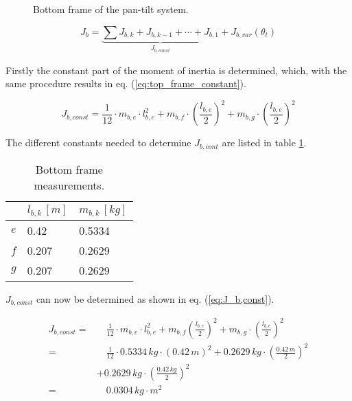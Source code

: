 \documentclass[../../main]{subfiles}
\begin{document}
\begin{figure}[h]
  \centering
  
  \caption{Bottom frame of the pan-tilt system.}
  \label{fig:BottomFrame}
\end{figure}

\begin{equation}
  \label{eq:Base_frame_eq}
  J_b =
  \underbrace{
  \sum J_{b,k} + J_{b,k-1} + \dotsb + J_{b,1}}_\text{$J_{b,const}$} + J_{b,var}(\theta_t)
\end{equation}

Firstly the constant part of the moment of inertia is determined, which, with the same procedure results in eq. (\ref{eq:top_frame_constant}).

\begin{equation}
  \label{eq:top_frame_constant}
  J_{b,const} = \frac{1}{12}\cdot m_{b,e}\cdot l_{b,e}^2 + m_{b,f} \cdot \left( \frac{l_{b,e}}{2} \right)^2 + m_{b,g} \cdot \left(\frac{l_{b,e}}{2}\right)^2
\end{equation}

The different constants needed to determine $J_{b,cont}$ are listed in table \ref{tab:Base_frame_table}.

\begin{table}[H]
\centering
\begin{tabular}{|l|l|l|}
\hline
  & $l_{b,k} \, \si{[m]}$ & $m_{b,k} \, \si{[kg]}$ \\
\hline
$e$ & 0.42  & 0.5334  \\
\hline
$f$ & 0.207  & 0.2629  \\
\hline
$g$ & 0.207 & 0.2629  \\
\hline
\end{tabular}
\caption{Bottom frame measurements.}
    \label{tab:Base_frame_table}
\end{table}

$J_{b,const}$ can now be determined as shown in eq. (\ref{eq:J_b,const}).

\begin{equation}
  \label{eq:J_b,const}
  \begin{split}
      J_{b,const} =& \quad \frac{1}{12} \cdot m_{b,e} \cdot l_{b,e}^2 + m_{b,f} \left( \frac{l_{b,e}}{2} \right)^2 + m_{b,g} \cdot \left(\frac{l_{b,e}}{2}\right)^2\\
      =& \quad \frac{1}{12} \cdot 0.5334\si{\,kg} \cdot (0.42 \si{\,m})^2 + 0.2629\si{\,kg} \cdot \left( \frac{0.42 \si{\,m}}{2} \right)^2 \\
      &+ 0.2629 \si{\,kg}\cdot \left(\frac{0.42 \si{\,kg}}{2}\right)^2\\
      =& \quad 0.0304 \si{\,kg\cdot m^2}
  \end{split}
\end{equation}
\end{document}
